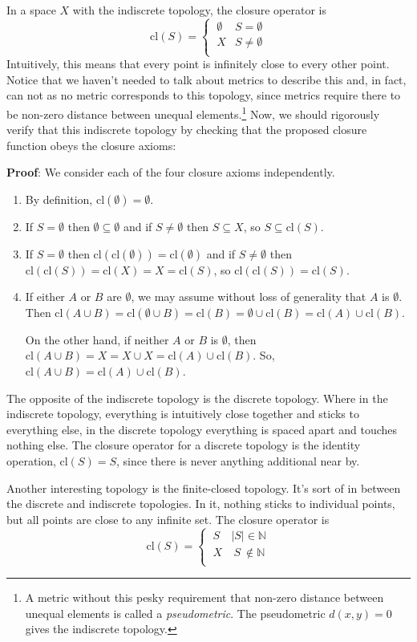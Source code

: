 \documentclass{report}
\newcommand{\cl}{\mathrm{cl}}
\begin{document}
In a space $X$ with the indiscrete topology, the closure operator is $$\cl(S) = \begin{cases} ~∅ & S = ∅\\ ~X & S \neq ∅\\ \end{cases} $$ Intuitively, this means that every point is infinitely close to every other point. Notice that we haven't needed to talk about metrics to describe this and, in fact, can not as no metric corresponds to this topology, since metrics require there to be non-zero distance between unequal elements.\footnote{A metric without this pesky requirement that non-zero distance between unequal elements is called a \emph{pseudometric}. The pseudometric $d(x,y) = 0$ gives the indiscrete topology.} Now, we should rigorously verify that this indiscrete topology by checking that the proposed closure function obeys the closure axioms:

{\bf Proof}: We consider each of the four closure axioms independently.
\begin{enumerate}
\item By definition, $\cl(∅) = ∅$.
\item If $S=∅$ then $∅ ⊆ ∅$ and if $S \neq ∅$ then $S ⊆ X$, so $S ⊆ \cl(S)$.
\item If $S=∅$ then $\cl(\cl(∅)) =  \cl(∅)$ and if $S \neq ∅$ then $\cl(\cl(S)) =  \cl(X) = X = \cl(S)$, so $\cl(\cl(S)) = \cl(S)$.
\item If either $A$ or $B$ are $∅$, we may assume without loss of generality that $A$ is $∅$. Then $\cl(A∪B) = \cl(∅∪B) = \cl(B) = ∅ ∪ \cl(B) = \cl(A) ∪ \cl(B)$. 

On the other hand, if neither $A$ or $B$ is $∅$, then $\cl(A∪B) = X = X∪X = \cl(A) ∪ \cl(B)$. So, $\cl(A∪B) =  \cl(A) ∪ \cl(B)$.
\end{enumerate}

The opposite of the indiscrete topology is the discrete topology. Where in the indiscrete topology, everything is intuitively close together and sticks to everything else, in the discrete topology everything is spaced apart and touches nothing else. The closure operator for a discrete topology is the identity operation, $\cl(S) = S$, since there is never anything additional near by.

Another interesting topology is the finite-closed topology. It's sort of in between the discrete and indiscrete topologies. In it, nothing sticks to individual points, but all points are close to any infinite set. The closure operator is $$\cl(S) = \begin{cases} ~S & |S| \in \mathbb{N}\\ ~X & ~S~ \not\in \mathbb{N}\\ \end{cases} $$
\end{document}
